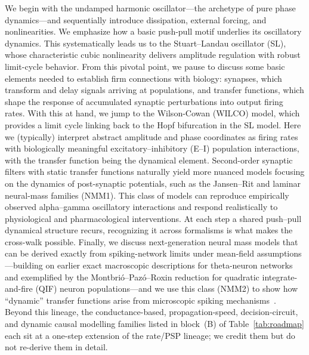\documentclass[12pt]{article}
\numberwithin{equation}{section}
\newcommand{\rev}[1]{\begingroup\color{navyblue}#1\endgroup}
\begin{document}
We begin with the undamped harmonic oscillator—the archetype of pure phase dynamics—and sequentially introduce dissipation, external forcing, and nonlinearities. We emphasize how a basic push-pull motif underlies its oscillatory dynamics.  This systematically leads us to the Stuart–Landau oscillator (SL), whose characteristic cubic nonlinearity delivers amplitude regulation with robust limit-cycle behavior. From this pivotal point, we pause to discuss some basic elements needed to establish firm connections with biology: synapses, which transform and delay signals arriving at populations, and transfer functions, which shape the response of accumulated synaptic perturbations into output firing rates. 
With this at hand, we jump to the Wilson-Cowan (WILCO) model, which provides a limit cycle linking back to the Hopf bifurcation in the SL model. Here we (typically) interpret abstract amplitude and phase coordinates as firing rates with biologically meaningful excitatory–inhibitory (E–I) population interactions, with the transfer function being the dynamical element. 
Second-order synaptic filters with static transfer functions naturally yield more nuanced models focusing on the dynamics of post-synaptic potentials, such as the Jansen–Rit and laminar neural-mass families (NMM1). This class of models can reproduce empirically observed alpha–gamma oscillatory interactions and respond realistically to physiological and pharmacological interventions.  \rev{At each step a shared push--pull dynamical structure recurs, recognizing it across formalisms is what makes the cross-walk possible.  Finally, we discuss next-generation neural mass models that can be derived exactly from spiking-network limits under mean-field assumptions—building on earlier exact macroscopic descriptions for theta-neuron networks and exemplified by the Montbrió–Pazó–Roxin reduction for quadratic integrate-and-fire (QIF) neuron  populations—and we use this class (NMM2) to show how ``dynamic'' transfer functions arise from microscopic spiking mechanisms~\cite{Montbrio:2015aa,so2014networks,luke2013complete}. Beyond this lineage, the conductance-based, propagation-speed, decision-circuit, and dynamic causal modelling families listed in block~(B) of Table~\ref{tab:roadmap} each sit at a one-step extension of the rate/PSP lineage; we credit them but do not re-derive them in detail.}


\end{document}
